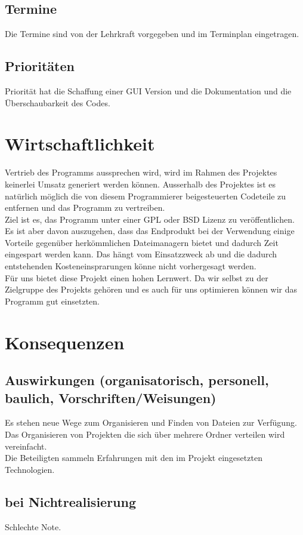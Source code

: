 \documentclass[10pt,paper=a4,final]{scrartcl}
\begin{document}
\subsection{Termine}
Die Termine sind von der Lehrkraft vorgegeben und im Terminplan eingetragen.
\subsection{Prioritäten}
Priorität hat die Schaffung einer GUI Version und die Dokumentation und die Überschaubarkeit des Codes.

\section{Wirtschaftlichkeit}
Vertrieb des Programms aussprechen wird, wird im Rahmen des Projektes keinerlei Umsatz generiert werden können. Ausserhalb des Projektes ist es natürlich möglich die von diesem Programmierer beigesteuerten Codeteile zu entfernen und das Programm zu vertreiben.\\
Ziel ist es, das Programm unter einer GPL oder BSD Lizenz zu veröffentlichen.\\
Es ist aber davon auszugehen, dass das Endprodukt bei der Verwendung einige Vorteile gegenüber herkömmlichen Dateimanagern bietet und dadurch Zeit eingespart werden kann. Das hängt vom Einsatzzweck ab und die dadurch entstehenden Kosteneinsprarungen könne nicht vorhergesagt werden.\\
Für uns bietet diese Projekt einen hohen Lernwert. Da wir selbst zu der Zielgruppe des Projekts gehören und es auch für uns optimieren können wir das Programm gut einsetzten.

\section{Konsequenzen}
\subsection{Auswirkungen (organisatorisch, personell, baulich, Vorschriften/Weisungen)}
Es stehen neue Wege zum Organisieren und Finden von Dateien zur Verfügung.\\
Das Organisieren von Projekten die sich über mehrere Ordner verteilen wird vereinfacht.\\
Die Beteiligten sammeln Erfahrungen mit den im Projekt eingesetzten Technologien.
\subsection{bei Nichtrealisierung}
Schlechte Note.
\end{document}
